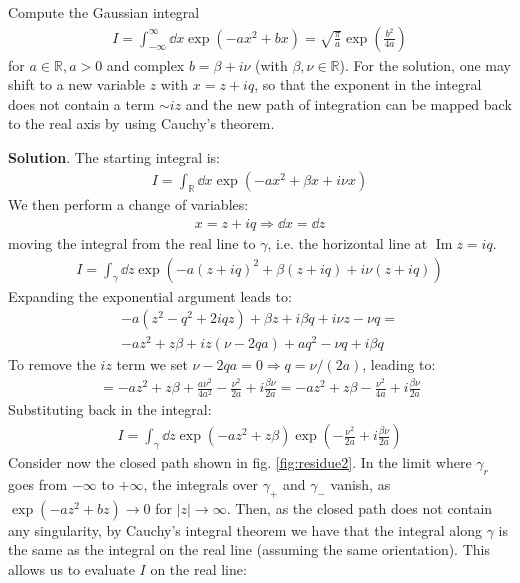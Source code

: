 \documentclass[../template.tex]{subfiles}
\begin{document}
\begin{exo}
    Compute the Gaussian integral
    \begin{align*}
        I = \int_{-\infty}^{\infty} \dd{x} \exp(-ax^2 + bx) = \sqrt{\frac{\pi}{a} } \exp\left(\frac{b^2}{4a} \right)
    \end{align*}
    for $a \in \mathbb{R}, a > 0$ and complex $b = \beta + i \nu$ (with $\beta, \nu \in \mathbb{R}$). For the solution, one may shift to a new variable $z$ with $x=z+iq$, so that the exponent in the integral does not contain a term $\sim iz$ and the new path of integration can be mapped back to the real axis by using Cauchy's theorem.
\medskip

    \textbf{Solution}. The starting integral is:
    \begin{align*}
        I = \int_{\mathbb{R}} \dd{x} \exp(-ax^2 + \beta x + i \nu x)
    \end{align*}
    We then perform a change of variables:
    \begin{align*}
        x = z + iq \Rightarrow \dd{x} = \dd{z}
    \end{align*}
    moving the integral from the real line to $\gamma$, i.e. the horizontal line at $\operatorname{Im} z  = iq$.
    \begin{align*}
        I = \int_\gamma \dd{z} \exp(-a(z+iq)^2 + \beta(z+iq) + i \nu (z + iq) )
    \end{align*}
    Expanding the exponential argument leads to:
    \begin{align*}
        -a(z^2 - q^2 + 2iqz) + \beta z + i \beta q + i \nu z - \nu q =\\
        -az^2 + z \beta + iz(\nu - 2 qa) + a q^2 - \nu q + i \beta q
    \end{align*}
    To remove the $iz$ term we set $\nu - 2 qa = 0 \Rightarrow q = \nu/(2a)$, leading to:
    \begin{align*}
        = -az^2 + z \beta + \frac{a \nu^2}{4 a^2} - \frac{\nu^2}{2a} + i\frac{\beta \nu}{2a} = -az^2 + z \beta -\frac{\nu^2}{4a} + i\frac{\beta \nu}{2a}     
    \end{align*}
    Substituting back in the integral:
    \begin{align*}
        I = \int_{\gamma} \dd{z} \exp(-az^2 + z \beta) \exp\left(-\frac{\nu^2}{2a} + i \frac{\beta \nu}{2a}  \right)
    \end{align*}
    Consider now the closed path shown in fig. \ref{fig:residue2}. In the limit where $\gamma_r$ goes from $-\infty$ to $+\infty$, the integrals over $\gamma_+$ and $\gamma_-$ vanish, as $\exp(-az^2+bz) \to 0$ for $|z| \to \infty$. Then, as the closed path does not contain any singularity, by Cauchy's integral theorem we have that the integral along $\gamma$ is the same as the integral on the real line (assuming the same orientation). This allows us to evaluate $I$ on the real line:

\end{exo}
\end{document}
